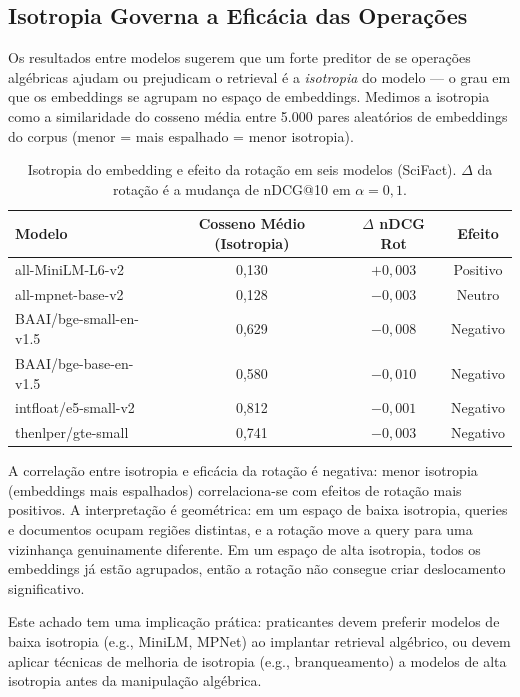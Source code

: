 \documentclass{article}
\begin{document}
\subsection{Isotropia Governa a Eficácia das Operações}
\label{sec:isotropy}

Os resultados entre modelos sugerem que um forte preditor de se operações algébricas ajudam ou prejudicam o retrieval é a \emph{isotropia} do modelo --- o grau em que os embeddings se agrupam no espaço de embeddings. Medimos a isotropia como a similaridade do cosseno média entre 5.000 pares aleatórios de embeddings do corpus (menor = mais espalhado = menor isotropia).

\begin{table}[ht]
\centering
\caption{Isotropia do embedding e efeito da rotação em seis modelos (SciFact). $\Delta$ da rotação é a mudança de nDCG@10 em $\alpha = 0{,}1$.}
\label{tab:isotropy}
\begin{tabular}{lccc}
\toprule
Modelo & Cosseno Médio (Isotropia) & $\Delta$ nDCG Rot & Efeito \\
\midrule
all-MiniLM-L6-v2 & 0,130 & $+0{,}003$ & Positivo \\
all-mpnet-base-v2 & 0,128 & $-0{,}003$ & Neutro \\
BAAI/bge-small-en-v1.5 & 0,629 & $-0{,}008$ & Negativo \\
BAAI/bge-base-en-v1.5 & 0,580 & $-0{,}010$ & Negativo \\
intfloat/e5-small-v2 & 0,812 & $-0{,}001$ & Negativo \\
thenlper/gte-small & 0,741 & $-0{,}003$ & Negativo \\
\bottomrule
\end{tabular}
\end{table}

A correlação entre isotropia e eficácia da rotação é negativa: menor isotropia (embeddings mais espalhados) correlaciona-se com efeitos de rotação mais positivos. A interpretação é geométrica: em um espaço de baixa isotropia, queries e documentos ocupam regiões distintas, e a rotação move a query para uma vizinhança genuinamente diferente. Em um espaço de alta isotropia, todos os embeddings já estão agrupados, então a rotação não consegue criar deslocamento significativo.

Este achado tem uma implicação prática: praticantes devem preferir modelos de baixa isotropia (e.g., MiniLM, MPNet) ao implantar retrieval algébrico, ou devem aplicar técnicas de melhoria de isotropia (e.g., branqueamento) a modelos de alta isotropia antes da manipulação algébrica.
\end{document}

